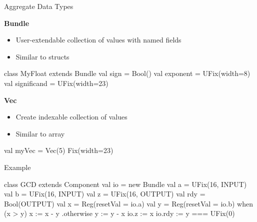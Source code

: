 \documentclass[xcolor=pdflatex,dvipsnames,table]{beamer}
\begin{document}
\begin{frame}[fragile]{Aggregate Data Types}

\textbf{Bundle}

\begin{itemize}
\item User-extendable collection of values with named fields
\item Similar to structs
\end{itemize}

\begin{footnotesize}
\begin{scala}
class MyFloat extends Bundle{
  val sign        = Bool()
  val exponent    = UFix(width=8)
  val significand = UFix(width=23)
}
\end{scala}
\end{footnotesize}

\textbf{Vec}

\begin{itemize}
\item Create indexable collection of values
\item Similar to array
\end{itemize}

\begin{footnotesize}
\begin{scala}
val myVec = Vec(5){ Fix(width=23) }
\end{scala}
\end{footnotesize}

\end{frame}

\begin{frame}[fragile]{Example}
\begin{footnotesize}
\begin{scala}
class GCD extends Component {
  val io = new Bundle {
    val a   = UFix(16, INPUT)
    val b   = UFix(16, INPUT)
    val z   = UFix(16, OUTPUT)
    val rdy = Bool(OUTPUT) }
  val x = Reg(resetVal = io.a)
  val y = Reg(resetVal = io.b)
  when (x > y) {
    x := x - y
  } .otherwise {
    y := y - x
  }
  io.z   := x
  io.rdy := y === UFix(0)
}
\end{scala}
\end{footnotesize}
\end{frame}
\end{document}
